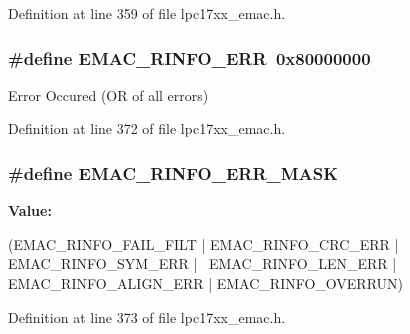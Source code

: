 \-Definition at line 359 of file lpc17xx\-\_\-emac.\-h.

\hypertarget{group___e_m_a_c___private___macros_ga1661e46e394b04c068461866b2f0d6b3}{
\subsubsection[{\-E\-M\-A\-C\-\_\-\-R\-I\-N\-F\-O\-\_\-\-E\-R\-R}]{\setlength{\rightskip}{0pt plus 5cm}\#define {\bf \-E\-M\-A\-C\-\_\-\-R\-I\-N\-F\-O\-\_\-\-E\-R\-R}~0x80000000}}\label{group___e_m_a_c___private___macros_ga1661e46e394b04c068461866b2f0d6b3}
\-Error \-Occured (\-O\-R of all errors) 

\-Definition at line 372 of file lpc17xx\-\_\-emac.\-h.

\hypertarget{group___e_m_a_c___private___macros_ga5a8bcd4d9714b0711f39c44063b65d13}{
\subsubsection[{\-E\-M\-A\-C\-\_\-\-R\-I\-N\-F\-O\-\_\-\-E\-R\-R\-\_\-\-M\-A\-S\-K}]{\setlength{\rightskip}{0pt plus 5cm}\#define \-E\-M\-A\-C\-\_\-\-R\-I\-N\-F\-O\-\_\-\-E\-R\-R\-\_\-\-M\-A\-S\-K}}\label{group___e_m_a_c___private___macros_ga5a8bcd4d9714b0711f39c44063b65d13}
{\bfseries \-Value\-:}
\begin{DoxyCode}
(EMAC_RINFO_FAIL_FILT | EMAC_RINFO_CRC_ERR   | EMAC_RINFO_SYM_ERR | \
EMAC_RINFO_LEN_ERR   | EMAC_RINFO_ALIGN_ERR | EMAC_RINFO_OVERRUN)
\end{DoxyCode}


\-Definition at line 373 of file lpc17xx\-\_\-emac.\-h.

